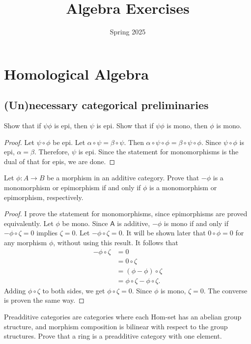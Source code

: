 \documentclass[11pt]{report}
\title{Algebra Exercises}
\date{Spring 2025}
\begin{document}
\makereport
{}
\chapter{Homological Algebra}
\section{(Un)necessary categorical preliminaries}
\begin{exercise}
	Show that if $\psi \phi $ is epi, then $\psi  $ is epi. Show that if $\psi \phi $ is mono, then $\phi $ is mono.
\end{exercise}
\begin{proof}
	Let $\psi \circ \phi $ be epi. Let $\alpha \circ \psi =\beta \circ \psi $. Then $\alpha \circ \psi \circ \phi =\beta \circ \psi \circ \phi $. Since $\psi \circ \phi $ is epi, $\alpha =\beta $. Therefore, $\psi $ is epi. Since the statement for monomorphisms is the dual of that for epis, we are done.
\end{proof}
\begin{exercise}
	Let $\phi : A \to B$ be a morphism in an additive category. Prove that $-\phi $ is a monomorphism or epimorphism if and only if $\phi $ is a monomorphism or epimorphism, respectively.
\end{exercise}
\begin{proof}
	I prove the statement for monomorphisms, since epimorphisms are proved equivalently. Let $\phi $ be mono. Since $\mathsf{A} $ is additive, $-\phi $ is mono if and only if $-\phi \circ \zeta =0$ implies $\zeta =0$. Let $-\phi \circ \zeta =0$. It will be shown later that $0\circ \phi =0$ for any morphism $\phi $, without using this result. It follows that
	\begin{align*}
		-\phi \circ \zeta &=0\\
				  &=0\circ \zeta \\
				  &=(\phi -\phi )\circ \zeta \\
				  &=\phi \circ \zeta -\phi \circ \zeta 
	.\end{align*}
	Adding $\phi \circ \zeta $ to both sides, we get $\phi \circ \zeta =0$. Since $\phi $ is mono, $\zeta =0$. The converse is proven the same way.
\end{proof}
\begin{exercise}
	Preadditive categories are categories where each Hom-set has an abelian group structure, and morphism composition is bilinear with respect to the group structures. Prove that a ring is a preadditive category with one element.
\end{exercise}
\end{document}

